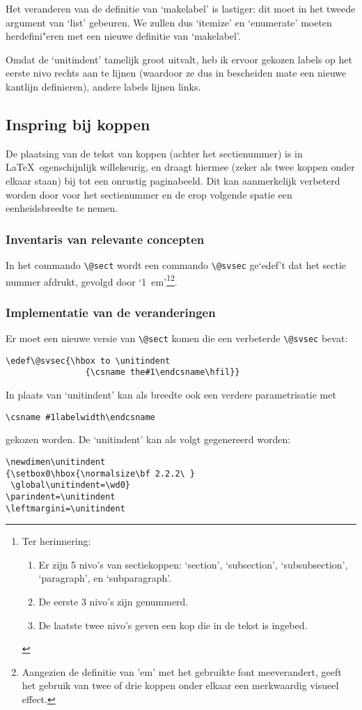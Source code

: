 \documentclass[oldtoc,a4paper,10pt]{rapport3}
\begin{document}
Het veranderen van de definitie van `makelabel' is lastiger: dit moet
in het tweede argument van `list' gebeuren. We zullen dus `itemize' en
`enumerate' moeten herdefini"eren met een nieuwe definitie van
`makelabel'.
 
Omdat de `unitindent' tamelijk groot uitvalt, heb ik ervoor gekozen
labels op het eerste nivo rechts aan te lijnen (waardoor ze dus in
bescheiden mate een nieuwe kantlijn definieren), andere labels lijnen
links.
 
 
 
\subsection{Inspring bij koppen}
 
De plaatsing van de tekst van koppen (achter het sectienummer) is in
\LaTeX\ ogenschijnlijk willekeurig, en draagt hiermee (zeker als twee
koppen onder elkaar staan) bij tot een onrustig paginabeeld. Dit kan
aanmerkelijk verbeterd worden door voor het sectienummer en de erop
volgende spatie een eenheidsbreedte te nemen.
 
\subsubsection{Inventaris van relevante concepten}
In het commando \verb.\@sect. wordt een commando \verb.\@svsec.
ge`edef't dat het sectie nummer afdrukt, gevolgd door
`1~em'\footnote{Ter herinnering:
  \begin{enumerate}
  \item Er zijn 5 nivo's van sectiekoppen: `section', `subsection',
    `subsubsection', `paragraph', en `subparagraph'.
  \item De eerste 3 nivo's zijn genummerd.
  \item De laatste twee nivo's geven een kop die in de tekst is
    ingebed.
  \end{enumerate}}\footnote{Aangezien de definitie van 'em' met het
  gebruikte font meeverandert, geeft het gebruik van twee of drie
  koppen onder elkaar een merkwaardig visueel effect.}.
 
\subsubsection{Implementatie van de veranderingen}
Er moet een nieuwe versie van \verb.\@sect. komen die een verbeterde
\verb.\@svsec. bevat:
\begin{verbatim}
\edef\@svsec{\hbox to \unitindent
                {\csname the#1\endcsname\hfil}}
\end{verbatim}
In plaats van `unitindent' kan als breedte ook een verdere
parametrisatie met
\begin{verbatim}
\csname #1labelwidth\endcsname
\end{verbatim}
gekozen worden.  De `unitindent' kan als volgt gegenereerd worden:
\begin{verbatim}
\newdimen\unitindent
{\setbox0\hbox{\normalsize\bf 2.2.2\ }
 \global\unitindent=\wd0}
\parindent=\unitindent
\leftmargini=\unitindent
\end{verbatim}
 
\end{document}
